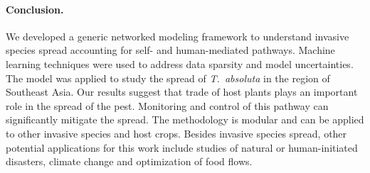 \documentclass[11pt]{article}
\newcommand{\tuta}{\emph{T.~absoluta}}
\theoremstyle{definition}
\begin{document}


\paragraph{Conclusion.} We developed a generic networked modeling framework
to understand invasive species spread accounting for self- and
human-mediated pathways. Machine learning techniques were used to address
data sparsity and model uncertainties. The model was applied to study the
spread of \tuta{} in the region of Southeast Asia. Our results suggest that
trade of host plants plays an important role in the spread of the pest.
Monitoring and control of this pathway can significantly mitigate the
spread. The methodology is modular and can be applied to
other invasive species and host crops. Besides invasive species spread,
other potential applications for this work include studies of natural or
human-initiated disasters, climate change and optimization of food flows.

\end{document}
